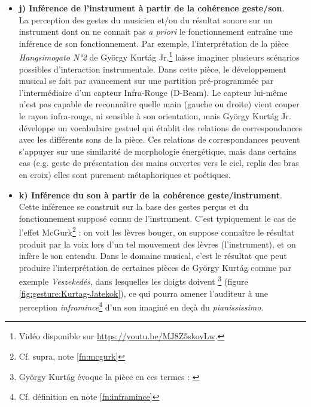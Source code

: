 \begin{itemize}[noitemsep]
	\item \textbf{j) Inférence de l'instrument à partir de la cohérence geste/son}.\\
	La perception des gestes du musicien et/ou du résultat sonore sur un instrument dont on ne connait pas \textit{a priori} le fonctionnement entraîne une inférence de son fonctionnement. Par exemple, l'interprétation de la pièce \textit{Hangsimogato N°2} de György Kurtág Jr.\footnote{Vidéo disponible sur \url{https://youtu.be/MJ8Z5skovLw}.} laisse imaginer plusieurs scénarios possibles d'interaction instrumentale. Dans cette pièce, le développement musical se fait par avancement sur une partition pré-programmée par l'intermédiaire d'un capteur Infra-Rouge (D-Beam). Le capteur lui-même n'est pas capable de reconnaître quelle main (gauche ou droite) vient couper le rayon infra-rouge, ni sensible à son orientation, mais György Kurtág Jr. développe un vocabulaire gestuel qui établit des relations de correspondances avec les différents sons de la pièce. Ces relations de correspondances peuvent s'appuyer sur une similarité de morphologie énergétique, mais dans certains cas (e.g. geste de présentation des mains ouvertes vers le ciel, replis des bras en croix) elles sont purement métaphoriques et poétiques.

	\item \textbf{k) Inférence du son à partir de la cohérence geste/instrument}.\\
	Cette inférence se construit sur la base des gestes perçus et du fonctionnement supposé connu de l'instrument. C'est typiquement le cas de l'effet McGurk\footnote{Cf. supra, note \ref{fn:mcgurk}} : on voit les lèvres bouger, on suppose connaître le résultat produit par la voix lors d'un tel mouvement des lèvres (l'instrument), et on infère le son entendu. Dans le domaine musical, c'est le résultat que peut produire l'interprétation de certaines pièces de György Kurtág comme par exemple \textit{Veszekedés}, dans lesquelles les doigts doivent \footnote{György Kurtág évoque la pièce en ces termes :  \cite{kurtag_gyorgy_2018}} (figure \ref{fig:gesture:Kurtag-Jatekok}), ce qui pourra amener l'auditeur à une perception \textit{inframince}\footnote{Cf. définition en note \ref{fn:inframince}} d'un son imaginé en deçà du \textit{pianississimo}.


\end{itemize}
